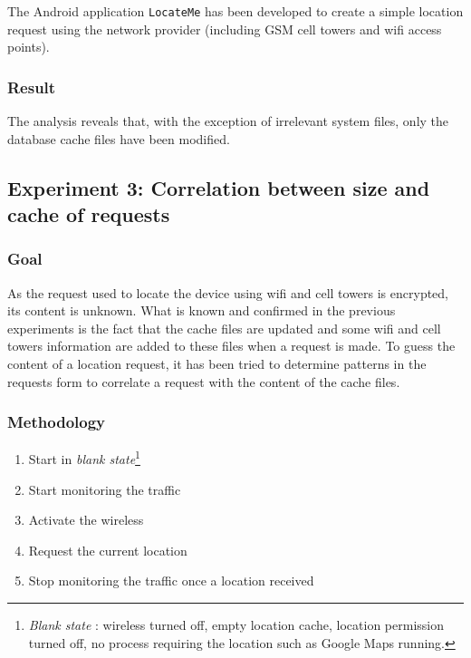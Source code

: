 The Android application \texttt{LocateMe} has been developed to create a simple location request using the network provider (including GSM cell towers and wifi access points).

\subsubsection{Result}

The analysis reveals that, with the exception of irrelevant system files, only the database cache files have been modified.\\

\subsection{Experiment 3: Correlation between size and cache of requests}

\subsubsection{Goal}

As the request used to locate the device using wifi and cell towers is encrypted, its content is unknown.
What is known and confirmed in the previous experiments is the fact that the cache files are updated and some wifi and cell towers information are added to these files when a request is made.
To guess the content of a location request, it has been tried to determine patterns in the requests form to correlate a request with the content of the cache files.

\subsubsection{Methodology}

\begin{enumerate}
\item Start in \emph{blank state}\footnote{\emph{Blank state} : wireless turned off, empty location cache, location permission turned off, no process requiring the location such as Google Maps running.}
\item Start monitoring the traffic
\item Activate the wireless
\item Request the current location
\item Stop monitoring the traffic once a location received
\end{enumerate}


